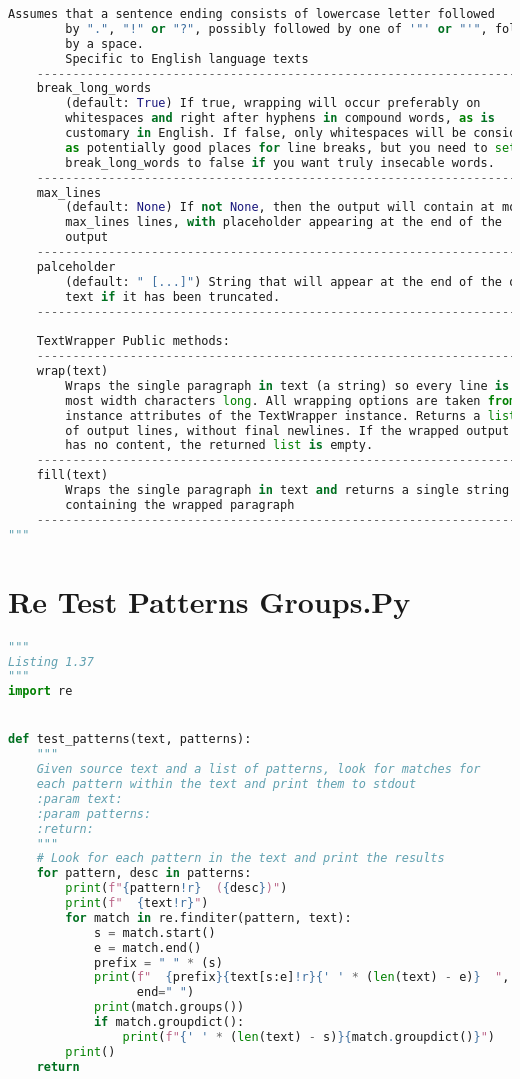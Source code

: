 \documentclass[a4paper,landscape]{report}
\begin{document}
\begin{lstlisting}[language=Python]
        Assumes that a sentence ending consists of lowercase letter followed
        by ".", "!" or "?", possibly followed by one of '"' or "'", followed
        by a space.
        Specific to English language texts
    --------------------------------------------------------------------
    break_long_words
        (default: True) If true, wrapping will occur preferably on 
        whitespaces and right after hyphens in compound words, as is
        customary in English. If false, only whitespaces will be considered
        as potentially good places for line breaks, but you need to set
        break_long_words to false if you want truly insecable words.
    --------------------------------------------------------------------
    max_lines
        (default: None) If not None, then the output will contain at most
        max_lines lines, with placeholder appearing at the end of the
        output
    --------------------------------------------------------------------
    palceholder
        (default: " [...]") String that will appear at the end of the output
        text if it has been truncated.
    --------------------------------------------------------------------
    
    TextWrapper Public methods:
    --------------------------------------------------------------------
    wrap(text)
        Wraps the single paragraph in text (a string) so every line is at
        most width characters long. All wrapping options are taken from
        instance attributes of the TextWrapper instance. Returns a list
        of output lines, without final newlines. If the wrapped output
        has no content, the returned list is empty.
    --------------------------------------------------------------------
    fill(text)
        Wraps the single paragraph in text and returns a single string
        containing the wrapped paragraph
    --------------------------------------------------------------------
"""

\end{lstlisting}
\section{Re Test Patterns Groups.Py}
\begin{lstlisting}[language=Python]
"""
Listing 1.37
"""
import re


def test_patterns(text, patterns):
    """
    Given source text and a list of patterns, look for matches for
    each pattern within the text and print them to stdout
    :param text:
    :param patterns:
    :return:
    """
    # Look for each pattern in the text and print the results
    for pattern, desc in patterns:
        print(f"{pattern!r}  ({desc})")
        print(f"  {text!r}")
        for match in re.finditer(pattern, text):
            s = match.start()
            e = match.end()
            prefix = " " * (s)
            print(f"  {prefix}{text[s:e]!r}{' ' * (len(text) - e)}  ",
                  end=" ")
            print(match.groups())
            if match.groupdict():
                print(f"{' ' * (len(text) - s)}{match.groupdict()}")
        print()
    return

\end{lstlisting}
\end{document}
